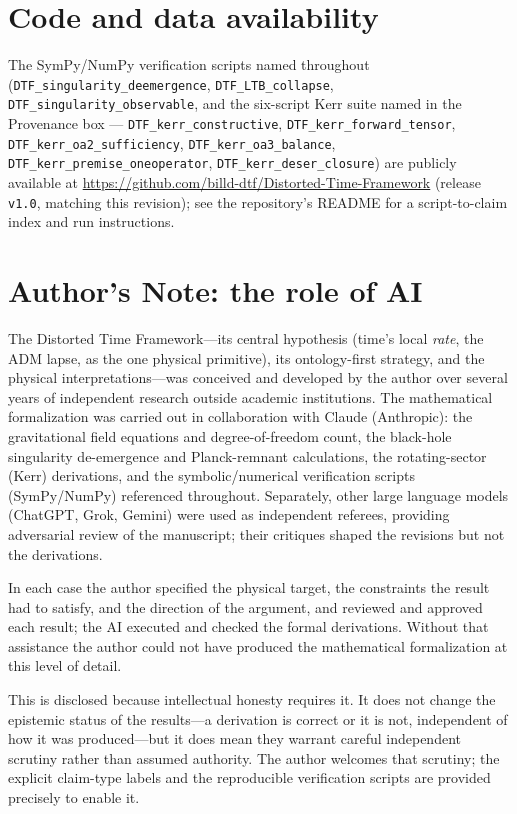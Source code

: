 \documentclass[11pt]{article}
\begin{document}
\section*{Code and data availability}
{\small The SymPy/NumPy verification scripts named throughout (\texttt{DTF\_singularity\_deemergence},
\texttt{DTF\_LTB\_collapse}, \texttt{DTF\_singularity\_observable}, and the six-script Kerr suite named in
the Provenance box --- \texttt{DTF\_kerr\_constructive}, \texttt{DTF\_kerr\_forward\_tensor},
\texttt{DTF\_kerr\_oa2\_sufficiency}, \texttt{DTF\_kerr\_oa3\_balance},
\texttt{DTF\_kerr\_premise\_oneoperator}, \texttt{DTF\_kerr\_deser\_closure}) are publicly available at
\url{https://github.com/billd-dtf/Distorted-Time-Framework} (release \texttt{v1.0}, matching this
revision); see the repository's README for a script-to-claim index and run instructions.\par}

\section*{Author's Note: the role of AI}
{\small
The Distorted Time Framework---its central hypothesis (time's local \emph{rate}, the ADM lapse,
as the one physical primitive), its ontology-first strategy, and the physical
interpretations---was conceived and developed by the author over several years of independent
research outside academic institutions. The mathematical formalization was carried out in
collaboration with Claude (Anthropic): the gravitational field equations and degree-of-freedom
count, the black-hole singularity de-emergence and Planck-remnant calculations, the rotating-sector
(Kerr) derivations, and the symbolic/numerical verification scripts (SymPy/NumPy) referenced
throughout. Separately, other large language models (ChatGPT, Grok, Gemini) were used as independent
referees, providing adversarial review of the manuscript; their critiques shaped the revisions but
not the derivations.

In each case the author specified the physical target, the constraints the result had to satisfy,
and the direction of the argument, and reviewed and approved each result; the AI executed and
checked the formal derivations. Without that assistance the author could not have produced the
mathematical formalization at this level of detail.

This is disclosed because intellectual honesty requires it. It does not change the epistemic status
of the results---a derivation is correct or it is not, independent of how it was produced---but it
does mean they warrant careful independent scrutiny rather than assumed authority. The author
welcomes that scrutiny; the explicit claim-type labels and the reproducible verification scripts are
provided precisely to enable it.
\par}
\end{document}
